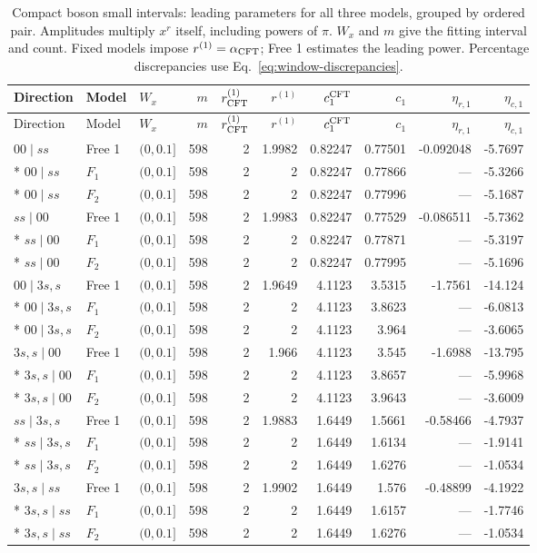 \begingroup\setlength{\tabcolsep}{2pt}
\begin{longtable}{lllrrrrrrr}
\caption{Compact boson small intervals: leading parameters for all three models, grouped by ordered pair. Amplitudes multiply $x^r$ itself, including powers of $\pi$. $W_x$ and $m$ give the fitting interval and count. Fixed models impose $r^{(1)}=\alpha_{\rm CFT}$; Free 1 estimates the leading power. Percentage discrepancies use Eq.~\eqref{eq:window-discrepancies}.}
\label{tab:window-small_boson-leading}\\\toprule
Direction & Model & $W_x$ & $m$ & $r^{(1)}_{\rm CFT}$ & $r^{(1)}$ & $c_1^{\rm CFT}$ & $c_1$ & $\eta_{r,1}$ & $\eta_{c,1}$\\\midrule
\endfirsthead
\toprule
Direction & Model & $W_x$ & $m$ & $r^{(1)}_{\rm CFT}$ & $r^{(1)}$ & $c_1^{\rm CFT}$ & $c_1$ & $\eta_{r,1}$ & $\eta_{c,1}$\\\midrule
\endhead
\bottomrule\endfoot
$00\mid ss$ & Free 1 & $(0,0.1]$ & 598 & 2 & 1.9982 & 0.82247 & 0.77501 & -0.092048 & -5.7697\\*
$00\mid ss$ & $F_1$ & $(0,0.1]$ & 598 & 2 & 2 & 0.82247 & 0.77866 & --- & -5.3266\\*
$00\mid ss$ & $F_2$ & $(0,0.1]$ & 598 & 2 & 2 & 0.82247 & 0.77996 & --- & -5.1687\\
\midrule
$ss\mid 00$ & Free 1 & $(0,0.1]$ & 598 & 2 & 1.9983 & 0.82247 & 0.77529 & -0.086511 & -5.7362\\*
$ss\mid 00$ & $F_1$ & $(0,0.1]$ & 598 & 2 & 2 & 0.82247 & 0.77871 & --- & -5.3197\\*
$ss\mid 00$ & $F_2$ & $(0,0.1]$ & 598 & 2 & 2 & 0.82247 & 0.77995 & --- & -5.1696\\
\midrule
$00\mid 3s,s$ & Free 1 & $(0,0.1]$ & 598 & 2 & 1.9649 & 4.1123 & 3.5315 & -1.7561 & -14.124\\*
$00\mid 3s,s$ & $F_1$ & $(0,0.1]$ & 598 & 2 & 2 & 4.1123 & 3.8623 & --- & -6.0813\\*
$00\mid 3s,s$ & $F_2$ & $(0,0.1]$ & 598 & 2 & 2 & 4.1123 & 3.964 & --- & -3.6065\\
\midrule
$3s,s\mid 00$ & Free 1 & $(0,0.1]$ & 598 & 2 & 1.966 & 4.1123 & 3.545 & -1.6988 & -13.795\\*
$3s,s\mid 00$ & $F_1$ & $(0,0.1]$ & 598 & 2 & 2 & 4.1123 & 3.8657 & --- & -5.9968\\*
$3s,s\mid 00$ & $F_2$ & $(0,0.1]$ & 598 & 2 & 2 & 4.1123 & 3.9643 & --- & -3.6009\\
\midrule
$ss\mid 3s,s$ & Free 1 & $(0,0.1]$ & 598 & 2 & 1.9883 & 1.6449 & 1.5661 & -0.58466 & -4.7937\\*
$ss\mid 3s,s$ & $F_1$ & $(0,0.1]$ & 598 & 2 & 2 & 1.6449 & 1.6134 & --- & -1.9141\\*
$ss\mid 3s,s$ & $F_2$ & $(0,0.1]$ & 598 & 2 & 2 & 1.6449 & 1.6276 & --- & -1.0534\\
\midrule
$3s,s\mid ss$ & Free 1 & $(0,0.1]$ & 598 & 2 & 1.9902 & 1.6449 & 1.576 & -0.48899 & -4.1922\\*
$3s,s\mid ss$ & $F_1$ & $(0,0.1]$ & 598 & 2 & 2 & 1.6449 & 1.6157 & --- & -1.7746\\*
$3s,s\mid ss$ & $F_2$ & $(0,0.1]$ & 598 & 2 & 2 & 1.6449 & 1.6276 & --- & -1.0534\\
\end{longtable}
\endgroup
